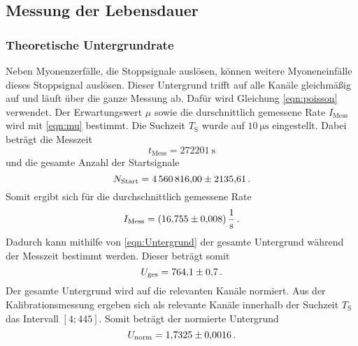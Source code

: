 \subsection{Messung der Lebensdauer}
  \subsubsection{Theoretische Untergrundrate}
    Neben Myonenzerfälle, die Stoppsignale auslösen, können weitere Myoneneinfälle dieses Stoppsignal auslösen.
    Dieser Untergrund trifft auf alle Kanäle gleichmäßig auf und läuft über die ganze Messung ab.
    Dafür wird Gleichung \eqref{eqn:poisson} verwendet.
    Der Erwartungswert $\mu$ sowie die durschnittlich gemessene Rate $I_\text{Mess}$ wird mit \eqref{eqn:mu} bestimmt.
    Die Suchzeit $T_\text{S}$ wurde auf $\SI{10}{\micro\second}$ eingestellt.
    Dabei beträgt die Messzeit
    \begin{equation*}
      t_\text{Mess} = \SI{272201}{\second}
    \end{equation*}
    und die gesamte Anzahl der Startsignale
    \begin{equation*}
      N_\text{Start} = \num{4560816 \pm 2135.61} \, .
    \end{equation*}
    Somit ergibt sich für die durchschnittlich gemessene Rate
    \begin{equation*}
      I_\text{Mess} = \SI{16.755 \pm 0.008}{\per\second} \, .
    \end{equation*}
    Dadurch kann mithilfe von \eqref{eqn:Untergrund} der gesamte Untergrund während der Messzeit bestimmt werden.
    Dieser beträgt somit
    \begin{equation*}
      U_\text{ges} = \num{764.1 \pm 0.7} \,.
    \end{equation*}
    Der gesamte Untergrund wird auf die relevanten Kanäle normiert.
    Aus der Kalibrationsmessung ergeben sich als relevante Kanäle innerhalb der Suchzeit $T_\text{S}$ das Intervall $[4;445]$.
    Somit beträgt der normierte Untergrund
    \begin{equation*}
      U_\text{norm} = \num{1.7325 \pm 0.0016} \, .
    \end{equation*}
  
